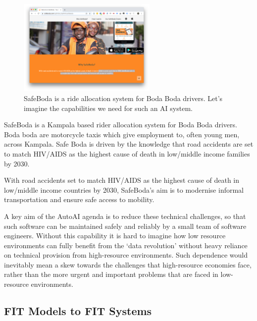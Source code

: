 \documentclass[a4paper]{caesar_book}
\begin{document}
\begin{figure}%
	\includegraphics[width=0.6\textwidth,keepaspectratio]{pictures/safe-boda.png}%
	\caption*{SafeBoda is a ride allocation system for Boda Boda drivers. Let’s imagine the capabilities we need for such an AI system.}%
\end{figure}%

SafeBoda is a Kampala based rider allocation system for Boda Boda drivers. Boda boda are motorcycle taxis which give employment to, often young men, across Kampala. Safe Boda is driven by the knowledge that road accidents are set to match HIV/AIDS as the highest cause of death in low/middle income families by 2030.

\begin{displayquote}
With road accidents set to match HIV/AIDS as the highest cause of death in low/middle income countries by 2030, SafeBoda’s aim is to modernise informal transportation and ensure safe access to mobility.
\end{displayquote}

A key aim of the AutoAI agenda is to reduce these technical challenges, so that such software can be maintained safely and reliably by a small team of software engineers. Without this capability it is hard to imagine how low resource environments can fully benefit from the ‘data revolution’ without heavy reliance on technical provision from high-resource environments. Such dependence would inevitably mean a skew towards the challenges that high-resource economies face, rather than the more urgent and important problems that are faced in low-resource environments.

\subsection{FIT Models to FIT Systems}
\end{document}
